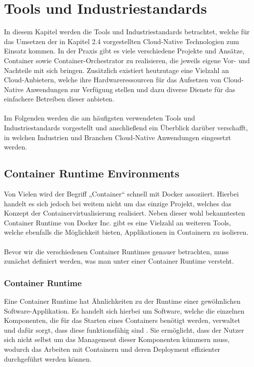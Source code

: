 \chapter{Tools und Industriestandards}
\label{ch:tools}
In diesem Kapitel werden die Tools und Industriestandards betrachtet, welche für das Umsetzen der in Kapitel 2.4 vorgestellten Cloud-Native Technologien zum Einsatz kommen. In der Praxis gibt es viele verschiedene Projekte und Ansätze, Container sowie Container-Orchestrator zu realisieren, die jeweils eigene Vor- und Nachteile mit sich bringen. Zusätzlich existiert heutzutage eine Vielzahl an Cloud-Anbietern, welche ihre Hardwareressourcen für das Aufsetzen von Cloud-Native Anwendungen zur Verfügung stellen und dazu diverse Dienste für das einfachere Betreiben dieser anbieten.
\\\\
Im Folgenden werden die am häufigsten verwendeten Tools und Industriestandards vorgestellt und anschließend ein Überblick darüber verschafft, in welchen Industrien und Branchen Cloud-Native Anwendungen eingesetzt werden.

\section{Container Runtime Environments}
Von Vielen wird der Begriff „Container“ schnell mit Docker assoziiert. Hierbei handelt es sich jedoch bei weitem nicht um das einzige Projekt, welches das Konzept der Containervirtualisierung realisiert. Neben dieser wohl bekanntesten Container Runtime von Docker Inc. gibt es eine Vielzahl an weiteren Tools, welche ebenfalls die Möglichkeit bieten, Applikationen in Containern zu isolieren.
\\\\
Bevor wir die verschiedenen Container Runtimes genauer betrachten, muss zunächst definiert werden, was man unter einer Container Runtime versteht.

\subsection{Container Runtime}
Eine Container Runtime hat Ähnlichkeiten zu der Runtime einer gewöhnlichen Software-Applikation. Es handelt sich hierbei um Software, welche die einzelnen Komponenten, die für das Starten eines Containers benötigt werden, verwaltet und dafür sorgt, dass diese funktionsfähig sind \cite{evan_baker_comprehensive_2021}. Sie ermöglicht, dass der Nutzer sich nicht selbst um das Management dieser Komponenten kümmern muss, wodurch das Arbeiten mit Containern und deren Deployment effizienter durchgeführt werden können.

